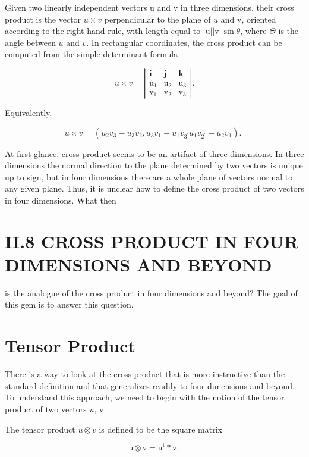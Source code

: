 \begin{CJK}{UTF8}{gbsn}
Given two linearly independent vectors $\mathrm{u}$ and $\mathrm{v}$ in three dimensions, their cross product is the vector $u \times v$ perpendicular to the plane of $u$ and $\mathrm{v}$, oriented according to the right-hand rule, with length equal to $|\mathrm{u}||\mathrm{v}| \sin \theta$, where $\Theta$ is the angle between $u$ and $v$. In rectangular coordinates, the cross product can be computed from the simple determinant formula

$$
u \times v=\left|\begin{array}{ccc}
\mathbf{i} & \mathbf{j} & \mathbf{k} \\
\mathrm{u}_{1} & \mathrm{u}_{2} & \mathrm{u}_{3} \\
\mathrm{v}_{1} & \mathrm{v}_{2} & \mathrm{v}_{3}
\end{array}\right| .
$$

Equivalently,

$$
u \times v=\left(u_{2} v_{3}-u_{3} v_{2}, u_{3} v_{1}-u_{1} v_{3^{\prime}} u_{1} v_{2^{\prime}}-u_{2} v_{1}\right) \text {. }
$$

At first glance, cross product seems to be an artifact of three dimensions. In three dimensions the normal direction to the plane determined by two vectors is unique up to sign, but in four dimensions there are a whole plane of vectors normal to any given plane. Thus, it is unclear how to define the cross product of two vectors in four dimensions. What then

\section{II.8 CROSS PRODUCT IN FOUR DIMENSIONS AND BEYOND}
is the analogue of the cross product in four dimensions and beyond? The goal of this gem is to answer this question.

\section{Tensor Product}
There is a way to look at the cross product that is more instructive than the standard definition and that generalizes readily to four dimensions and beyond. To understand this approach, we need to begin with the notion of the tensor product of two vectors $u$, v.

The tensor product $u \otimes v$ is defined to be the square matrix

$$
\mathrm{u} \otimes \mathrm{v}=\mathrm{u}^{\mathrm{t}} * \mathrm{v},
$$


\end{CJK}
